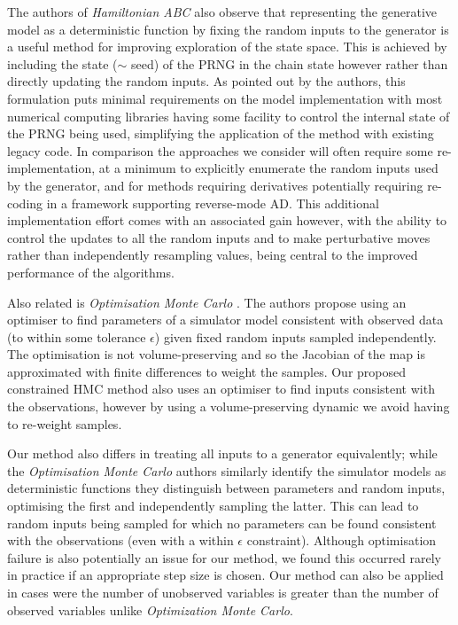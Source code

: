 The authors of \emph{Hamiltonian ABC} also observe that representing the generative model as a deterministic function by fixing the random inputs to the generator is a useful method for improving exploration of the state space. This is achieved by including the state ($\sim$ seed) of the \ac{PRNG} in the chain state however rather than directly updating the random inputs. As pointed out by the authors, this formulation puts minimal requirements on the model implementation with most numerical computing libraries having some facility to control the internal state of the \ac{PRNG} being used, simplifying the application of the method with existing legacy code. In comparison the approaches we consider will often require some re-implementation, at a minimum to explicitly enumerate the random inputs used by the generator, and for methods requiring derivatives potentially requiring re-coding in a framework supporting reverse-mode \ac{AD}. This additional implementation effort comes with an associated gain however, with the ability to control the updates to all the random inputs and to make perturbative moves rather than independently resampling values, being central to the improved performance of the algorithms. 

Also related is \emph{Optimisation Monte Carlo} \citep{meeds2015optimization}. The authors propose using an optimiser to find parameters of a simulator model consistent with observed data (to within some tolerance $\epsilon$) given fixed random inputs sampled independently. The optimisation is not volume-preserving and so the Jacobian of the map is approximated with finite differences to weight the samples. Our proposed constrained \ac{HMC} method also uses an optimiser to find inputs consistent with the observations, however by using a volume-preserving dynamic we avoid having to re-weight samples. %

Our method also differs in treating all inputs to a generator equivalently; while the \emph{Optimisation Monte Carlo} authors similarly identify the simulator models as deterministic functions they distinguish between parameters and random inputs, optimising the first and independently sampling the latter. This can lead to random inputs being sampled for which no parameters can be found consistent with the observations (even with a within $\epsilon$ constraint). Although optimisation failure is also potentially an issue for our method, we found this occurred rarely in practice if an appropriate step size is chosen. Our method can also be applied in cases were the number of unobserved variables is greater than the number of observed variables unlike \emph{Optimization Monte Carlo}.

